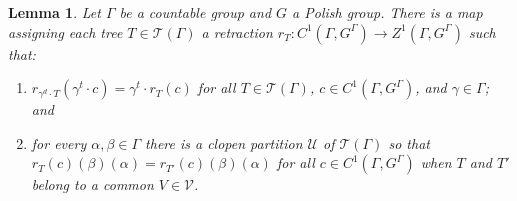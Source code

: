 \documentclass[12pt]{amsart}
\newtheorem{lem}[thm]{Lemma}
\theoremstyle{definition}
\def\cal{\mathcal}
\begin{document}
\begin{lem} \label{lem:retract}
	Let $\Gamma$ be a countable group and $G$ a Polish group. There is a map assigning each tree $T \in \cal T(\Gamma)$ a retraction $r_T : C^1(\Gamma, G^\Gamma) \rightarrow Z^1(\Gamma, G^\Gamma)$ such that:
	\begin{enumerate}
		\item \label{item:retract1} $r_{\gamma^d \cdot T}(\gamma^t \cdot c) = \gamma^t \cdot r_T(c)$ for all $T \in \cal T(\Gamma)$, $c \in C^1(\Gamma, G^\Gamma)$, and $\gamma \in \Gamma$; and
		\item \label{item:retract2} for every $\alpha, \beta \in \Gamma$ there is a clopen partition $\cal U$ of $\cal T(\Gamma)$ so that $r_T(c)(\beta)(\alpha) = r_{T'}(c)(\beta)(\alpha)$ for all $c \in C^1(\Gamma, G^\Gamma)$ when $T$ and $T'$ belong to a common $V \in \cal V$.
	\end{enumerate}
\end{lem}
\end{document}
